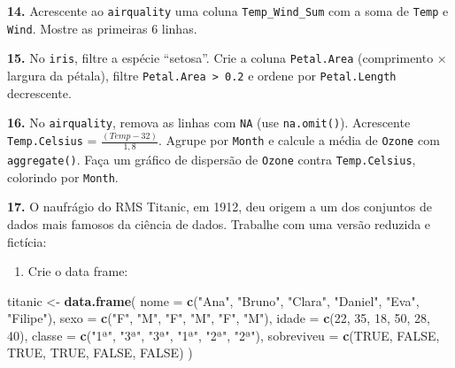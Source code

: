\documentclass[
  portuguese,
  11pt,
  openany]{book}
\newenvironment{Shaded}{\begin{snugshade}}{\end{snugshade}}
\newcommand{\AttributeTok}[1]{\textcolor[rgb]{0.13,0.29,0.53}{#1}}
\newcommand{\ConstantTok}[1]{\textcolor[rgb]{0.56,0.35,0.01}{#1}}
\newcommand{\DecValTok}[1]{\textcolor[rgb]{0.00,0.00,0.81}{#1}}
\newcommand{\FunctionTok}[1]{\textcolor[rgb]{0.13,0.29,0.53}{\textbf{#1}}}
\newcommand{\NormalTok}[1]{#1}
\newcommand{\OtherTok}[1]{\textcolor[rgb]{0.56,0.35,0.01}{#1}}
\newcommand{\StringTok}[1]{\textcolor[rgb]{0.31,0.60,0.02}{#1}}
\providecommand{\tightlist}{%
  \setlength{\itemsep}{0pt}\setlength{\parskip}{0pt}}
\begin{document}
\textbf{14.} Acrescente ao \texttt{airquality} uma coluna \texttt{Temp\_Wind\_Sum} com a soma de \texttt{Temp}
e \texttt{Wind}. Mostre as primeiras 6 linhas.

\textbf{15.} No \texttt{iris}, filtre a espécie ``setosa''. Crie a coluna \texttt{Petal.Area}
(comprimento × largura da pétala), filtre \texttt{Petal.Area\ \textgreater{}\ 0.2} e ordene por
\texttt{Petal.Length} decrescente.

\textbf{16.} No \texttt{airquality}, remova as linhas com \texttt{NA} (use \texttt{na.omit()}). Acrescente
\texttt{Temp.Celsius} = \(\frac{(Temp - 32)}{1{,}8}\). Agrupe por \texttt{Month} e calcule a média
de \texttt{Ozone} com \texttt{aggregate()}. Faça um gráfico de dispersão de \texttt{Ozone} contra
\texttt{Temp.Celsius}, colorindo por \texttt{Month}.

\textbf{17.} O naufrágio do RMS Titanic, em 1912, deu origem a um dos conjuntos de
dados mais famosos da ciência de dados. Trabalhe com uma versão reduzida e
fictícia:

\begin{enumerate}
\def\labelenumi{(\alph{enumi})}
\tightlist
\item
  Crie o data frame:
\end{enumerate}

\begin{Shaded}
\begin{Highlighting}[]
\NormalTok{titanic }\OtherTok{\textless{}{-}} \FunctionTok{data.frame}\NormalTok{(}
  \AttributeTok{nome =} \FunctionTok{c}\NormalTok{(}\StringTok{"Ana"}\NormalTok{, }\StringTok{"Bruno"}\NormalTok{, }\StringTok{"Clara"}\NormalTok{, }\StringTok{"Daniel"}\NormalTok{, }\StringTok{"Eva"}\NormalTok{, }\StringTok{"Filipe"}\NormalTok{),}
  \AttributeTok{sexo =} \FunctionTok{c}\NormalTok{(}\StringTok{"F"}\NormalTok{, }\StringTok{"M"}\NormalTok{, }\StringTok{"F"}\NormalTok{, }\StringTok{"M"}\NormalTok{, }\StringTok{"F"}\NormalTok{, }\StringTok{"M"}\NormalTok{),}
  \AttributeTok{idade =} \FunctionTok{c}\NormalTok{(}\DecValTok{22}\NormalTok{, }\DecValTok{35}\NormalTok{, }\DecValTok{18}\NormalTok{, }\DecValTok{50}\NormalTok{, }\DecValTok{28}\NormalTok{, }\DecValTok{40}\NormalTok{),}
  \AttributeTok{classe =} \FunctionTok{c}\NormalTok{(}\StringTok{"1ª"}\NormalTok{, }\StringTok{"3ª"}\NormalTok{, }\StringTok{"3ª"}\NormalTok{, }\StringTok{"1ª"}\NormalTok{, }\StringTok{"2ª"}\NormalTok{, }\StringTok{"2ª"}\NormalTok{),}
  \AttributeTok{sobreviveu =} \FunctionTok{c}\NormalTok{(}\ConstantTok{TRUE}\NormalTok{, }\ConstantTok{FALSE}\NormalTok{, }\ConstantTok{TRUE}\NormalTok{, }\ConstantTok{TRUE}\NormalTok{, }\ConstantTok{FALSE}\NormalTok{, }\ConstantTok{FALSE}\NormalTok{)}
\NormalTok{)}
\end{Highlighting}
\end{Shaded}
\end{document}

